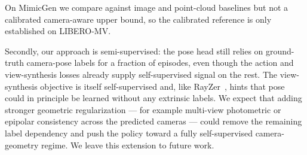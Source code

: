 On MimicGen we compare against image and
point-cloud baselines but not a calibrated camera-aware upper bound, so the
calibrated reference is only established on LIBERO-MV.  


Secondly, our approach is semi-supervised: the pose head still relies on
ground-truth camera-pose labels for a fraction of episodes, even though the
action and view-synthesis losses already supply self-supervised signal on the
rest.  The view-synthesis objective is itself self-supervised and, like
RayZer~\citep{jiang2025rayzer}, hints that pose could in principle be learned
without any extrinsic labels.  We expect that adding stronger geometric
regularization --- for example multi-view photometric or epipolar consistency
across the predicted cameras --- could remove the remaining label dependency and
push the policy toward a fully self-supervised camera-geometry regime.  We leave
this extension to future work.
